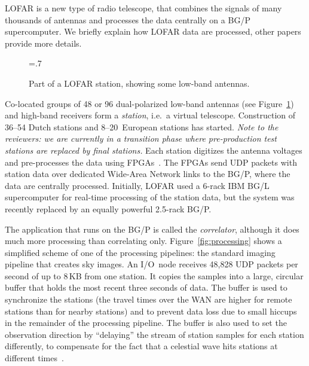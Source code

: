 \documentclass[journal]{IEEEtran}
\begin{document}
LOFAR is a new type of radio telescope, that combines the signals of many
thousands of antennas and processes the data centrally on a BG/P supercomputer.
We briefly explain how LOFAR data are processed, other papers provide more
details\cite{Romein:06,Iskra:08}.


\addtocounter{figure}{-2}
\begin{figure}[h]
\begin{center}
\epsfxsize=.7\columnwidth
{}
\end{center}
\caption{Part of a LOFAR station, showing some low-band antennas.}
\label{fig:station}
\end{figure}
\addtocounter{figure}{1}

Co-located groups of 48 or 96 dual-polarized low-band antennas (see
Figure~\ref{fig:station}) and high-band receivers form a \emph{station},
i.e.\ a virtual telescope.
Construction of 36--54 Dutch stations and 8--20~European stations has started.
\emph{Note to the reviewers: we are currently in a transition phase
where pre-production test stations are replaced by final stations.}
Each station digitizes the antenna voltages and pre-processes the data using
FPGAs~\cite{Gunst:07}.
The FPGAs send UDP packets with station data over dedicated Wide-Area
Network links to the BG/P, where the data are centrally processed.
Initially, LOFAR used a 6-rack IBM BG/L supercomputer for real-time
processing of the station data, but the system was recently replaced by an
equally powerful 2.5-rack BG/P.

The application that runs on the BG/P is called the \emph{correlator},
although it does much more processing than correlating only.
Figure~\ref{fig:processing} shows a simplified scheme of one of the processing
pipelines: the standard imaging pipeline that creates sky images.
An I/O~node receives 48,828 UDP packets per second of up to 8\,KB from one
station.
It copies the samples into a large, circular buffer that holds the most recent
three seconds of data.
The buffer is used to synchronize the stations (the travel times over the
WAN are higher for remote stations than for nearby stations) and to prevent
data loss due to small hiccups in the remainder of the processing pipeline.
The buffer is also used to set the observation direction by ``delaying''
the stream of station samples for each station differently, to compensate for
the fact that a celestial wave hits stations at different
times~\cite[Sec.~2.1]{Romein:06}.
\end{document}
